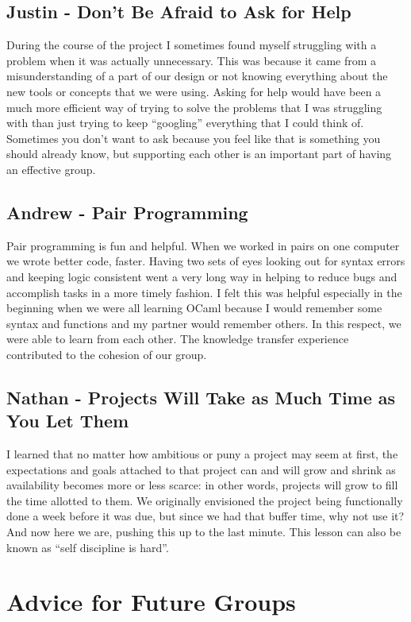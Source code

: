 \subsection{Justin - Don't Be Afraid to Ask for Help}
During the course of the project I sometimes found myself struggling with a problem when it was actually unnecessary. This was because it came from a misunderstanding of a part of our design or not knowing everything about the new tools or concepts that we were using. Asking for help would have been a much more efficient way of trying to solve the problems that I was struggling with than just trying to keep ``googling'' everything that I could think of. Sometimes you don't want to ask because you feel like that is something you should already know, but supporting each other is an important part of having an effective group.

\subsection{Andrew - Pair Programming}
Pair programming is fun and helpful. When we worked in pairs on one computer we wrote better code, faster. Having two sets of eyes looking out for syntax errors and keeping logic consistent went a very long way in helping to reduce bugs and accomplish tasks in a more timely fashion. I felt this was helpful especially in the beginning when we were all learning OCaml because I would remember some syntax and functions and my partner would remember others. In this respect, we were able to learn from each other. The knowledge transfer experience contributed to the cohesion of our group.

\subsection{Nathan - Projects Will Take as Much Time as You Let Them}
I learned that no matter how ambitious or puny a project may seem at
first, the expectations and goals attached to that project can and
will grow and shrink as availability becomes more or less scarce: in
other words, projects will grow to fill the time allotted to them. We
originally envisioned the project being functionally done a week
before it was due, but since we had that buffer time, why not use it?
And now here we are, pushing this up to the last minute. This lesson
can also be known as ``self discipline is hard''.

\section{Advice for Future Groups}

